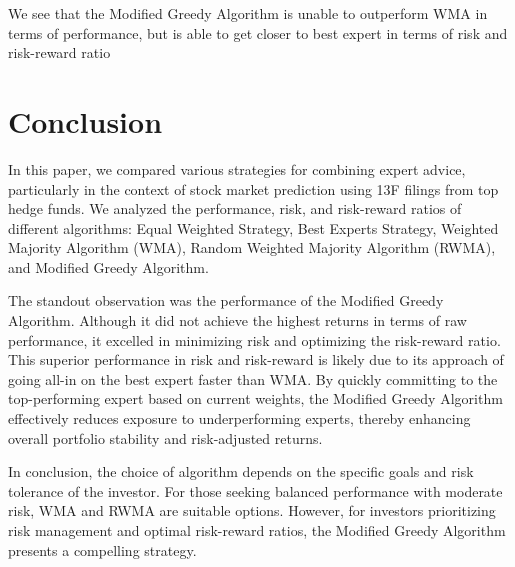 \documentclass{article}
\begin{document}
We see that the Modified Greedy Algorithm is unable to outperform WMA in terms of performance, but is able to get closer to best expert in terms of risk and risk-reward ratio

\section{Conclusion}
\label{sec:conclusion}
In this paper, we compared various strategies for combining expert advice, particularly in the context of stock market prediction using 13F filings from top hedge funds. We analyzed the performance, risk, and risk-reward ratios of different algorithms: Equal Weighted Strategy, Best Experts Strategy, Weighted Majority Algorithm (WMA), Random Weighted Majority Algorithm (RWMA), and Modified Greedy Algorithm.

The standout observation was the performance of the Modified Greedy Algorithm. Although it did not achieve the highest returns in terms of raw performance, it excelled in minimizing risk and optimizing the risk-reward ratio. This superior performance in risk and risk-reward is likely due to its approach of going all-in on the best expert faster than WMA. By quickly committing to the top-performing expert based on current weights, the Modified Greedy Algorithm effectively reduces exposure to underperforming experts, thereby enhancing overall portfolio stability and risk-adjusted returns.

In conclusion, the choice of algorithm depends on the specific goals and risk tolerance of the investor. For those seeking balanced performance with moderate risk, WMA and RWMA are suitable options. However, for investors prioritizing risk management and optimal risk-reward ratios, the Modified Greedy Algorithm presents a compelling strategy.
\end{document}
